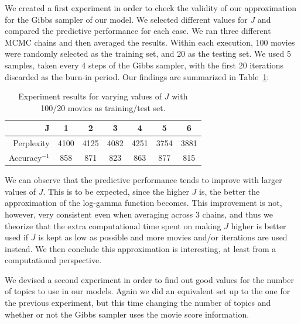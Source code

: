 \documentclass[a4paper,10pt]{article}
\begin{document}
We created a first experiment in order to check the validity of our approximation for the Gibbs sampler of our model. 
We selected different values for $J$ and compared the predictive performance for each case. 
We ran three different MCMC chains and then averaged the results. 
Within each execution, 100 movies were randomly selected as the training set, and 20 as the testing set. 
We used 5 samples, taken every 4 steps of the Gibbs sampler, with the first 20 iterations discarded as the burn-in period. 
Our findings are summarized in Table~\ref{table:J}:

\begin{table}[ht!]
\begin{center}
\begin{tabular}{r|cccccc}
J               & 1 & 2 & 3 & 4 & 5 & 6 \\ \hline
Perplexity      & 4100 & 4125 & 4082 & 4251 & 3754 & 3881 \\
Accuracy$^{-1}$ & 858 & 871 & 823 & 863 & 877 & 815 \\
\end{tabular}
\end{center}
\caption{Experiment results for varying values of $J$ with 100/20 movies as training/test set.}
\label{table:J}
\end{table}

We can observe that the predictive performance tends to improve with larger values of $J$. 
This is to be expected, since the higher $J$ is, the better the approximation of the log-gamma function becomes.
This improvement is not, however, very consistent even when averaging across 3 chains, and thus we theorize that the extra computational time spent on making $J$ higher is better used if $J$ is kept as low as possible and more movies and/or iterations are used instead.
We then conclude this approximation is interesting, at least from a computational perspective.

We devised a second experiment in order to find out good values for the number of topics to use in our models.
Again we did an equivalent set up to the one for the previous experiment, but this time changing the number of topics and whether or not the Gibbs sampler uses the movie score information.
\end{document}
